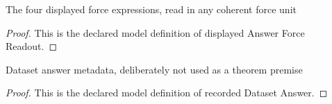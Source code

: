 \begin{definition}
  \label{def:physics:phyx-mini-0799:phyxminiproblems-problemphyxmini0799-displayedanswerforcereadout}
  The four displayed force expressions, read in any coherent force unit
\end{definition}
\begin{proof}
  This is the declared model definition of displayed Answer Force Readout.
\end{proof}
\begin{definition}
  \label{def:physics:phyx-mini-0799:phyxminiproblems-problemphyxmini0799-recordeddatasetanswer}
  Dataset answer metadata, deliberately not used as a theorem premise
\end{definition}
\begin{proof}
  This is the declared model definition of recorded Dataset Answer.
\end{proof}
